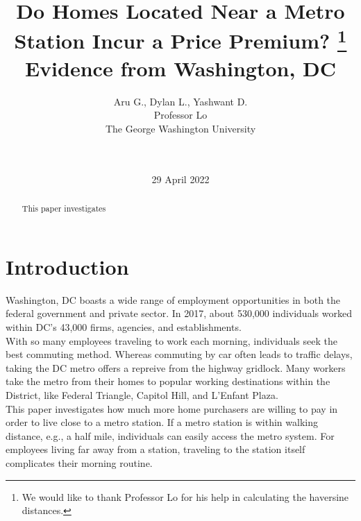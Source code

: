 \documentclass[12pt]{report}
\newcommand\tab[1][.50cm]{\hspace*{#1}}
\begin{document}
\title{%
Do Homes Located Near a Metro Station Incur a Price Premium? \thanks{{We would like to thank Professor Lo for his help in calculating the haversine distances.}} \\ 
\Large
Evidence from Washington, DC}
\author{Aru G., Dylan L., Yashwant D. \\ Professor Lo\\The George Washington University\\  \\  \\ }
\date{29 April 2022}

\maketitle





\begin{abstract}
\smallskip
This paper investigates 

\end{abstract}

\section*{Introduction}
Washington, DC boasts a wide range of employment opportunities in both the federal government and private sector. In 2017, about 530,000 individuals worked within DC's 43,000 firms, agencies, and establishments.\\
\tab With so many employees traveling to work each morning, individuals seek the best commuting method. Whereas commuting by car often leads to traffic delays, taking the DC metro offers a repreive from the highway gridlock. Many workers take the metro from their homes to popular working destinations within the District, like Federal Triangle, Capitol Hill, and L'Enfant Plaza.\\
\tab This paper investigates how much more home purchasers are willing to pay in order to live close to a metro station. If a metro station is within walking distance, e.g., a half mile, individuals can easily access the metro system. For employees living far away from a station, traveling to the station itself complicates their morning routine.  
\end{document}
